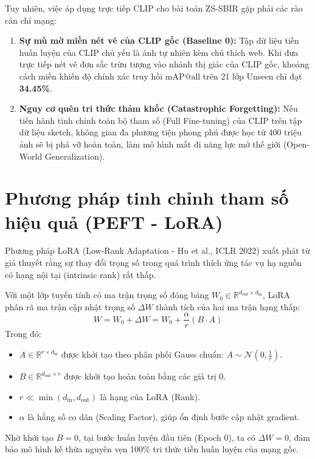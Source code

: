 \documentclass[12pt,a4paper]{report}
\begin{document}
Tuy nhiên, việc áp dụng trực tiếp CLIP cho bài toán ZS-SBIR gặp phải các rào cản chí mạng:
\begin{enumerate}
    \item \textbf{Sự mù mờ miền nét vẽ của CLIP gốc (Baseline 0):} Tập dữ liệu tiền huấn luyện của CLIP chủ yếu là ảnh tự nhiên kèm chú thích web. Khi đưa trực tiếp nét vẽ đơn sắc trừu tượng vào nhánh thị giác của CLIP gốc, khoảng cách miền khiến độ chính xác truy hồi $\text{mAP@all}$ trên 21 lớp Unseen chỉ đạt \textbf{34.45\%}.
    \item \textbf{Nguy cơ quên tri thức thảm khốc (Catastrophic Forgetting):} Nếu tiến hành tinh chỉnh toàn bộ tham số (Full Fine-tuning) của CLIP trên tập dữ liệu sketch, không gian đa phương tiện phong phú được học từ 400 triệu ảnh sẽ bị phá vỡ hoàn toàn, làm mô hình mất đi năng lực mở thế giới (Open-World Generalization).
\end{enumerate}

\section{Phương pháp tinh chỉnh tham số hiệu quả (PEFT - LoRA)}
Phương pháp LoRA (Low-Rank Adaptation - Hu et al., ICLR 2022) xuất phát từ giả thuyết rằng sự thay đổi trọng số trong quá trình thích ứng tác vụ hạ nguồn có hạng nội tại (intrinsic rank) rất thấp. 

Với một lớp tuyến tính có ma trận trọng số đóng băng $W_0 \in \mathbb{R}^{d_{\text{out}} \times d_{\text{in}}}$, LoRA phân rã ma trận cập nhật trọng số $\Delta W$ thành tích của hai ma trận hạng thấp:
\begin{equation}
    W = W_0 + \Delta W = W_0 + \frac{\alpha}{r} (B \cdot A)
\end{equation}
Trong đó:
\begin{itemize}
    \item $A \in \mathbb{R}^{r \times d_{\text{in}}}$ được khởi tạo theo phân phối Gauss chuẩn: $A \sim \mathcal{N}(0, \frac{1}{r})$.
    \item $B \in \mathbb{R}^{d_{\text{out}} \times r}$ được khởi tạo hoàn toàn bằng các giá trị $0$.
    \item $r \ll \min(d_{\text{in}}, d_{\text{out}})$ là hạng của LoRA (Rank).
    \item $\alpha$ là hằng số co dãn (Scaling Factor), giúp ổn định bước cập nhật gradient.
\end{itemize}

Nhờ khởi tạo $B=0$, tại bước huấn luyện đầu tiên (Epoch 0), ta có $\Delta W = 0$, đảm bảo mô hình kế thừa nguyên vẹn 100\% tri thức tiền huấn luyện của mạng gốc.
\end{document}

